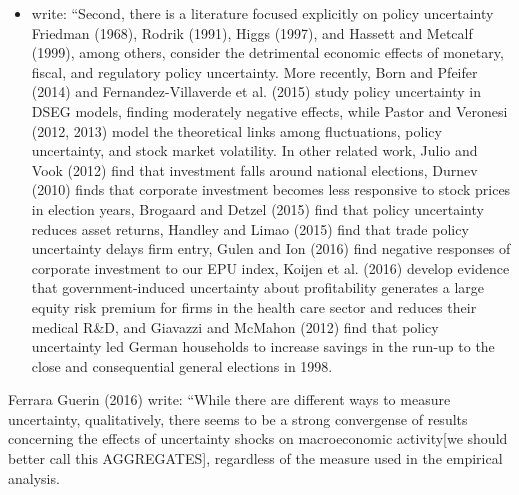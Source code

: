 \documentclass[a4paper,11pt,listof=nochaptergap,oneside,pointednumbers,bibtotoc,bigheadings,liststotoc]{scrbook}
\theoremstyle{mysatz}
\theoremstyle{mydefinition}
\theoremstyle{mybemerkung}
\begin{document}
\begin{itemize}
	\item \citet[p. 1597]{bakeretal:15} write: ``Second, there is a literature focused explicitly on policy uncertainty Friedman (1968), Rodrik (1991), Higgs (1997), and Hassett and Metcalf (1999), among others, consider the detrimental economic effects of monetary, fiscal, and regulatory policy uncertainty. More recently, Born and Pfeifer (2014) and Fernandez-Villaverde et al. (2015) study policy uncertainty in DSEG models, finding moderately negative effects, while Pastor and Veronesi (2012, 2013) model the theoretical links among fluctuations, policy uncertainty, and stock market volatility. In other related work, Julio and Vook (2012) find that investment falls around national elections, Durnev (2010) finds that corporate investment becomes less responsive to stock prices in election years, Brogaard and Detzel (2015) find that policy uncertainty reduces asset returns, Handley and Limao (2015) find that trade policy uncertainty delays firm entry, Gulen and Ion (2016) find negative responses of corporate investment to our EPU index, Koijen et al. (2016) develop evidence that government-induced uncertainty about profitability generates a large equity risk premium for firms in the health care sector and reduces their medical R\&D, and Giavazzi and McMahon (2012) find that policy uncertainty led German households to increase savings in the run-up to the close and consequential general elections in 1998. 
\end{itemize}
\endgroup

Ferrara Guerin (2016) write: “While there are different ways to measure uncertainty, qualitatively, there seems to be a strong convergense of results concerning the effects of uncertainty shocks on macroeconomic activity[we should better call this AGGREGATES], regardless of the measure used in the empirical analysis.
\end{document}
